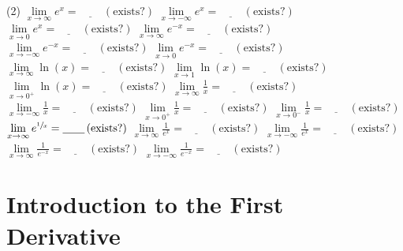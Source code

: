 \documentclass[10pt,oneside,]{book}
\theoremstyle{plain}
\theoremstyle{definition}
\numberwithin{equation}{section}
\newcommand{\fe}[2]{#1\mathopen{}\left(#2\right)\mathclose{}}
\begin{document}
\begin{exercisegroup}(2)
\exercise[24.]\hypertarget{exercise-160}{\null}\(\lim\limits_{x\to\infty}e^x=\underline{\qquad}\,(\text{exists?})\)%
\exercise[25.]\hypertarget{exercise-161}{\null}\(\lim\limits_{x\to-\infty}e^x=\underline{\qquad}\,(\text{exists?})\)%
\exercise[26.]\hypertarget{exercise-162}{\null}\(\lim\limits_{x\to0}e^x=\underline{\qquad}\,(\text{exists?})\)%
\exercise[27.]\hypertarget{exercise-163}{\null}\(\lim\limits_{x\to\infty}e^{-x}=\underline{\qquad}\,(\text{exists?})\)%
\exercise[28.]\hypertarget{exercise-164}{\null}\(\lim\limits_{x\to-\infty}e^{-x}=\underline{\qquad}\,(\text{exists?})\)%
\exercise[29.]\hypertarget{exercise-165}{\null}\(\lim\limits_{x\to0}e^{-x}=\underline{\qquad}\,(\text{exists?})\)%
\exercise[30.]\hypertarget{exercise-166}{\null}\(\lim\limits_{x\to\infty}\fe{\ln}{x}=\underline{\qquad}\,(\text{exists?})\)%
\exercise[31.]\hypertarget{exercise-167}{\null}\(\lim\limits_{x\to1}\fe{\ln}{x}=\underline{\qquad}\,(\text{exists?})\)%
\exercise[32.]\hypertarget{exercise-168}{\null}\(\lim\limits_{x\to0^{+}}\fe{\ln}{x}=\underline{\qquad}\,(\text{exists?})\)%
\exercise[33.]\hypertarget{exercise-169}{\null}\(\lim\limits_{x\to\infty}\frac{1}{x}=\underline{\qquad}\,(\text{exists?})\)%
\exercise[34.]\hypertarget{exercise-170}{\null}\(\lim\limits_{x\to-\infty}\frac{1}{x}=\underline{\qquad}\,(\text{exists?})\)%
\exercise[35.]\hypertarget{exercise-171}{\null}\(\lim\limits_{x\to0^{+}}\frac{1}{x}=\underline{\qquad}\,(\text{exists?})\)%
\exercise[36.]\hypertarget{exercise-172}{\null}\(\lim\limits_{x\to0^{-}}\frac{1}{x}=\underline{\qquad}\,(\text{exists?})\)%
\exercise[37.]\hypertarget{exercise-173}{\null}\(\lim\limits_{x\to\infty}e^{\sfrac{1}{x}}=\underline{\qquad}\,(\text{exists?})\)%
\exercise[38.]\hypertarget{exercise-174}{\null}\(\lim\limits_{x\to\infty}\frac{1}{e^x}=\underline{\qquad}\,(\text{exists?})\)%
\exercise[39.]\hypertarget{exercise-175}{\null}\(\lim\limits_{x\to-\infty}\frac{1}{e^x}=\underline{\qquad}\,(\text{exists?})\)%
\exercise[40.]\hypertarget{exercise-176}{\null}\(\lim\limits_{x\to\infty}\frac{1}{e^{-x}}=\underline{\qquad}\,(\text{exists?})\)%
\exercise[41.]\hypertarget{exercise-177}{\null}\(\lim\limits_{x\to-\infty}\frac{1}{e^{-x}}=\underline{\qquad}\,(\text{exists?})\)%
\end{exercisegroup}
\par\smallskip\noindent
\typeout{************************************************}
\typeout{************************************************}
\chapter[Introduction to the First Derivative]{Introduction to the First Derivative}\label{chapter-introduction-first-derivative}
\typeout{************************************************}
\typeout{************************************************}
\end{document}
